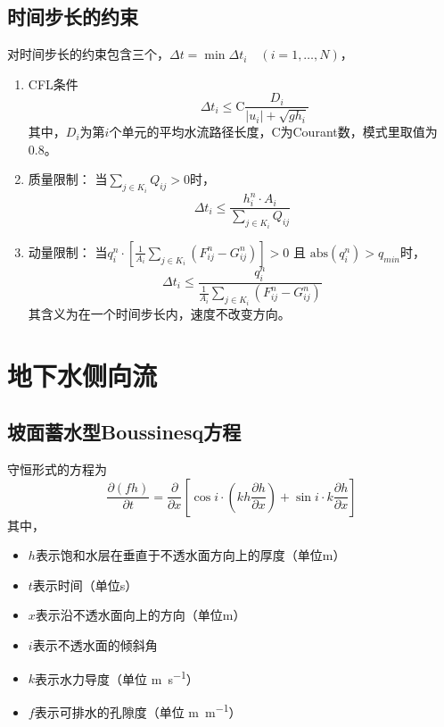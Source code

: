 \subsection{时间步长的约束}
对时间步长的约束包含三个，$\Delta t = \min \Delta t_i \quad (i=1, \ldots, N)$，
\begin{enumerate}
\item CFL条件
\begin{equation}
\qquad \Delta t_i \leq \mathrm{C}\frac{ D_i }{\left| u_{i}\right| + \sqrt{gh_{i}}}
\end{equation}
其中，$D_i$为第$i$个单元的平均水流路径长度，C为Courant数，模式里取值为0.8。
\item 质量限制：
当$\sum_{j\in K_i} Q_{ij}>0$时，
  \begin{equation}
 \Delta t_i \leq \frac{h^n_i\cdot A_i}{\sum_{j\in K_i} Q_{ij}}
 \end{equation}
\item 动量限制：
当$q^n_i \cdot \left[ \frac{1}{A_i}\sum_{j\in K_i} \left(F^n_{ij} - G^n_{ij} \right)\right] > 0$ 且 $\mathrm{abs}\left(q^n_i\right) > q_{min}$时，
  \begin{equation}
 \Delta t_i \leq \frac{q^n_i}{\frac{1}{A_i}\sum_{j\in K_i} \left(F^n_{ij} - G^n_{ij} \right)}
 \end{equation}
其含义为在一个时间步长内，速度不改变方向。
 \end{enumerate}


\section{地下水侧向流}
\subsection{坡面蓄水型Boussinesq方程}
守恒形式的方程为
\begin{equation}
\frac{\partial \left(fh\right)}{\partial t} = \frac{\partial}{\partial x} \left[\cos i \cdot \left(kh\frac{\partial h}{\partial x}\right)+\sin i\cdot k\frac{\partial h}{\partial x}\right]
\end{equation}
其中，
\begin{itemize}
\item $h$表示饱和水层在垂直于不透水面方向上的厚度（单位m）
\item $t$表示时间（单位s）
\item $x$表示沿不透水面向上的方向（单位m）
\item $i$表示不透水面的倾斜角
\item $k$表示水力导度（单位 \unit{m.s^{-1}}）
\item $f$表示可排水的孔隙度（单位 \unit{m.m^{-1}}）
\end{itemize}


